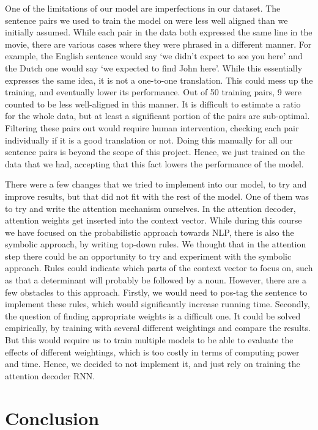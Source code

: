 \documentclass[11pt]{article}
\begin{document}
One of the limitations of our model are imperfections in our dataset. The sentence pairs we used to train the model on were less well aligned than we initially assumed. While each pair in the data both expressed the same line in the movie, there are various cases where they were phrased in a different manner. For example, the English sentence would say ‘we didn’t expect to see you here’ and the Dutch one would say ‘we expected to find John here’. While this essentially expresses the same idea, it is not a one-to-one translation. This could mess up the training, and eventually lower its performance. Out of 50 training pairs, 9 were counted to be less well-aligned in this manner. It is difficult to estimate a ratio for the whole data, but at least a significant portion of the pairs are sub-optimal. Filtering these pairs out would require human intervention, checking each pair individually if it is a good translation or not. Doing this manually for all our sentence pairs is beyond the scope of this project. Hence, we just trained on the data that we had, accepting that this fact lowers the performance of the model.

There were a few changes that we tried to implement into our model, to try and improve results, but that did not fit with the rest of the model. One of them was to try and write the attention mechanism ourselves. In the attention decoder, attention weights get inserted into the context vector. While during this course we have focused on the probabilistic approach towards NLP, there is also the symbolic approach, by writing top-down rules. We thought that in the attention step there could be an opportunity to try and experiment with the symbolic approach. Rules could indicate which parts of the context vector to focus on, such as that a determinant will probably be followed by a noun. However, there are a few obstacles to this approach. Firstly, we would need to pos-tag the sentence to implement these rules, which would significantly increase running time. Secondly, the question of finding appropriate weights is a difficult one. It could be solved empirically, by training with several different weightings and compare the results. But this would require us to train multiple models to be able to evaluate the effects of different weightings, which is too costly in terms of computing power and time. Hence, we decided to not implement it, and just rely on training the attention decoder RNN.

\section{Conclusion}
\end{document}
